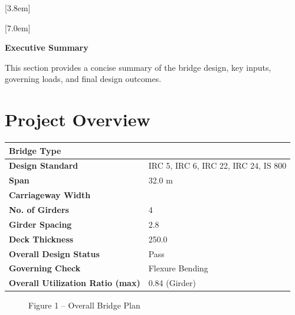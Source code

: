 \documentclass[12pt,a4paper]{report}
\numberwithin{table}{chapter}
\numberwithin{figure}{chapter}
\begin{document}
[3.8em]
  {\normalfont}
  {\contentslabel{2.3em}}
  {\hspace*{-2.3em}}
  {\hfill\contentspage}

[7.0em]
  {\normalfont}
  {\contentslabel{3.2em}}
  {\hspace*{-3.2em}}
  {\hfill\contentspage}

\newpage
\renewcommand{\contentsname}{\centering\Large\bfseries Table of Contents}
\tableofcontents


\newpage
{\centering\Large\bfseries Executive Summary\par}
\vspace{0.8em}

This section provides a concise summary of the bridge design, key inputs, governing loads, and final design outcomes.

\section*{Project Overview}
\label{sec:project-overview}


\begin{tabular}{|L{5.5cm}|L{8.5cm}|}
\hline
\textbf{Bridge Type} &  \\
\hline
\textbf{Design Standard} & IRC 5, IRC 6, IRC 22, IRC 24, IS 800 \\
\hline
\textbf{Span} & 32.0 m \\
\hline
\textbf{Carriageway Width} &  \\
\hline
\textbf{No. of Girders} & 4 \\
\hline
\textbf{Girder Spacing} & 2.8 \\
\hline
\textbf{Deck Thickness} & 250.0 \\
\hline
\textbf{Overall Design Status} & Pass \\
\hline
\textbf{Governing Check} & Flexure Bending \\
\hline
\textbf{Overall Utilization Ratio (max)} & 0.84 (Girder) \\
\hline
\end{tabular}


\begin{figure}[H]
\centering
{}
\caption*{Figure 1 -- Overall Bridge Plan}
\end{figure}
\end{document}

